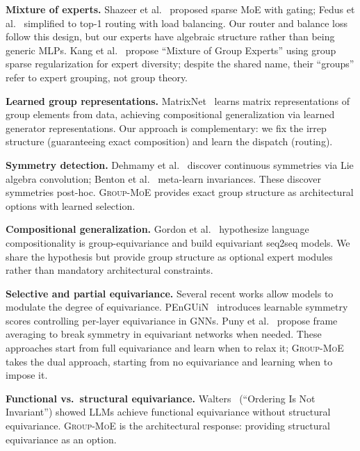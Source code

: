\documentclass[10pt, letterpaper]{article}
\newcommand{\gmoe}{\textsc{Group-MoE}}
\begin{document}
\textbf{Mixture of experts.} Shazeer et al.~\cite{shazeer2017outrageously} proposed sparse MoE with gating; Fedus et al.~\cite{fedus2022switch} simplified to top-1 routing with load balancing. Our router and balance loss follow this design, but our experts have algebraic structure rather than being generic MLPs. Kang et al.~\cite{kang2025mixture} propose ``Mixture of Group Experts'' using group sparse regularization for expert diversity; despite the shared name, their ``groups'' refer to expert grouping, not group theory.

\textbf{Learned group representations.} MatrixNet~\cite{laird2024matrixnet} learns matrix representations of group elements from data, achieving compositional generalization via learned generator representations. Our approach is complementary: we fix the irrep structure (guaranteeing exact composition) and learn the dispatch (routing).

\textbf{Symmetry detection.} Dehmamy et al.~\cite{dehmamy2021automatic} discover continuous symmetries via Lie algebra convolution; Benton et al.~\cite{benton2020learning} meta-learn invariances. These discover symmetries post-hoc. \gmoe{} provides exact group structure as architectural options with learned selection.

\textbf{Compositional generalization.} Gordon et al.~\cite{gordon2020permutation} hypothesize language compositionality is group-equivariance and build equivariant seq2seq models. We share the hypothesis but provide group structure as optional expert modules rather than mandatory architectural constraints.

\textbf{Selective and partial equivariance.} Several recent works allow models to modulate the degree of equivariance. PEnGUiN~\cite{penguin2025} introduces learnable symmetry scores controlling per-layer equivariance in GNNs. Puny et al.~\cite{puny2022frame} propose frame averaging to break symmetry in equivariant networks when needed. These approaches start from full equivariance and learn when to relax it; \gmoe{} takes the dual approach, starting from no equivariance and learning when to impose it.

\textbf{Functional vs.\ structural equivariance.} Walters~\cite{walters2025ordering} (``Ordering Is Not Invariant'') showed LLMs achieve functional equivariance without structural equivariance. \gmoe{} is the architectural response: providing structural equivariance as an option.

\end{document}
